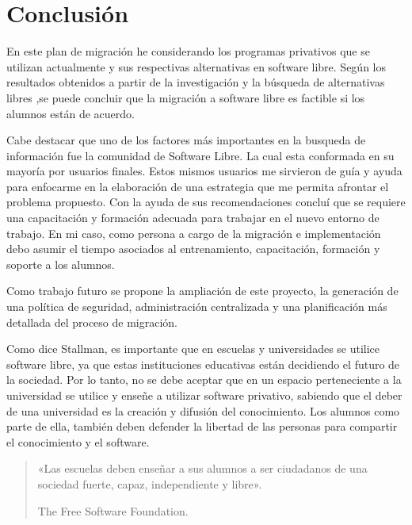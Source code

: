 \chapter{Conclusión}\label{ch:Conclusión}

	En este plan de migración he considerando los programas privativos que se utilizan actualmente y sus respectivas alternativas en software libre. Según los resultados obtenidos a partir de la investigación y la búsqueda de alternativas libres ,se puede concluir que la migración a software libre es factible si los alumnos están de acuerdo.\par
	
	Cabe destacar que uno de los factores más importantes en la busqueda de información fue la comunidad de Software Libre. La cual esta conformada en su mayoría por usuarios finales. Estos mismos usuarios me sirvieron de guía y ayuda para enfocarme en la elaboración de una estrategia que me permita afrontar el problema propuesto. Con la ayuda de sus recomendaciones concluí que se requiere una capacitación y formación adecuada para trabajar en el nuevo entorno de trabajo. En mi caso, como persona a cargo de la migración e implementación debo asumir el tiempo asociados al entrenamiento, capacitación, formación y soporte a los alumnos.\par
	
	Como trabajo futuro se propone la ampliación de este proyecto, la generación de una política de seguridad, administración centralizada y una planificación más detallada del proceso de migración.
	
	Como dice Stallman, es importante que en escuelas y universidades se utilice software libre, ya que estas instituciones educativas están decidiendo el futuro de la sociedad. Por lo tanto, no se debe	aceptar que en un espacio perteneciente a la universidad se utilice y enseñe a utilizar software privativo, sabiendo que el deber de una universidad es la creación y difusión del conocimiento. Los alumnos como parte de ella, también deben defender la libertad de las personas para compartir el conocimiento y el software.
	
	\vspace{0.3cm}
	
	\begin{quote}
		
		\begin{flushright}
			
		{\small	«Las escuelas deben enseñar a sus alumnos a ser ciudadanos de una sociedad fuerte, capaz, independiente y libre».\par
		
		The Free Software Foundation.}
		
	\end{flushright}

		
	\end{quote}

